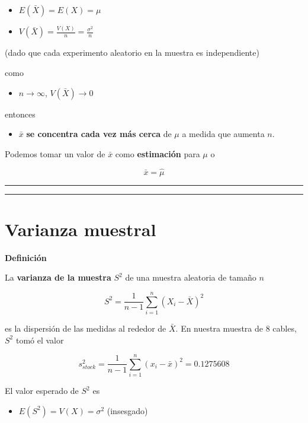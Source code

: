 \documentclass[
]{book}
\providecommand{\tightlist}{%
  \setlength{\itemsep}{0pt}\setlength{\parskip}{0pt}}
\begin{document}
\begin{itemize}
\tightlist
\item
  \(E(\bar{X})=E(X)=\mu\)
\item
  \(V(\bar{X})=\frac{V(X)}{n}=\frac{\sigma^2}{n}\)
\end{itemize}

(dado que cada experimento aleatorio en la muestra es independiente)

como

\begin{itemize}
\tightlist
\item
  \(n \rightarrow \infty\), \(V(\bar{X}) \rightarrow 0\)
\end{itemize}

entonces

\begin{itemize}
\tightlist
\item
  \(\bar{x}\) \textbf{se concentra cada vez más cerca} de \(\mu\) a medida que aumenta \(n\).
\end{itemize}

Podemos tomar un valor de \(\bar{x}\) como \textbf{estimación} para \(\mu\) o

\[\bar{x}=\hat{\mu}\]

\begin{center}\rule{0.5\linewidth}{0.5pt}\end{center}

\begin{center}\rule{0.5\linewidth}{0.5pt}\end{center}

\hypertarget{varianza-muestral}{%
\section{Varianza muestral}\label{varianza-muestral}}

\textbf{Definición}

La \textbf{varianza de la muestra} \(S^2\) de una muestra aleatoria de tamaño \(n\)

\[S^2= \frac{1}{n-1}\sum_{i=1}^n (X_i-\bar{X})^2\]

es la dispersión de las medidas al rededor de \(\bar{X}\). En nuestra muestra de \(8\) cables, \(S^2\) tomó el valor

\[s_{stock}^2=\frac{1}{n-1}\sum_{i=1}^n (x_i-\bar{x})^2=0.1275608\]

El valor esperado de \(S^2\) es

\begin{itemize}
\tightlist
\item
  \(E(S^2)=V(X)=\sigma^2\) (insesgado)
\end{itemize}
\end{document}
